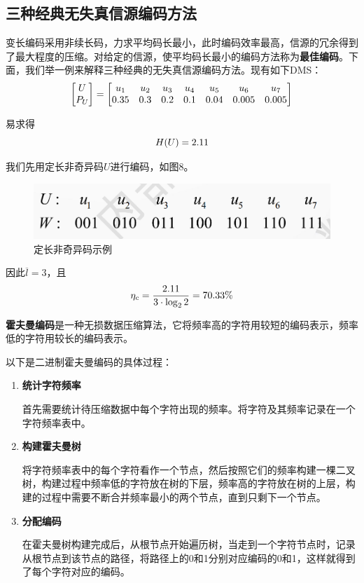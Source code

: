 \documentclass[UTF8,a4paper,11pt]{article}
\begin{document}
\subsection{三种经典无失真信源编码方法}
变长编码采用非续长码，力求平均码长最小，此时编码效率最高，信源的冗余得到了最大程度的压缩。对给定的信源，使平均码长最小的编码方法称为\textbf{最佳编码}。下面，我们举一例来解释三种经典的无失真信源编码方法。现有如下DMS：
\begin{equation}
\notag
\begin{bmatrix}
U\\ 
P_U\\ 
\end{bmatrix}
=
\begin{bmatrix}
u_1&u_2&u_3&u_4&u_5&u_6&u_7\\ 
0.35&0.3&0.2&0.1&0.04&0.005&0.005\\ 
\end{bmatrix}
\end{equation}

易求得
\begin{equation}
\notag
H(U)=2.11
\end{equation}

我们先用定长非奇异码$U$进行编码，如图8。
\begin{figure}[htbp]
\centering
\includegraphics[scale=0.45]{p8.png}
\caption{定长非奇异码示例}
\end{figure}

因此$\overline{l}=3$，且
\begin{equation}
\notag
\eta_c=\frac{2.11}{3\cdot\log_{2}{2}}=70.33\%
\end{equation}

\textbf{霍夫曼编码}是一种无损数据压缩算法，它将频率高的字符用较短的编码表示，频率低的字符用较长的编码表示。

以下是二进制霍夫曼编码的具体过程：
\begin{enumerate}
\item \textbf{统计字符频率}

首先需要统计待压缩数据中每个字符出现的频率。将字符及其频率记录在一个字符频率表中。

\item \textbf{构建霍夫曼树}

将字符频率表中的每个字符看作一个节点，然后按照它们的频率构建一棵二叉树，构建过程中频率低的字符放在树的下层，频率高的字符放在树的上层，构建的过程中需要不断合并频率最小的两个节点，直到只剩下一个节点。

\item \textbf{分配编码}

在霍夫曼树构建完成后，从根节点开始遍历树，当走到一个字符节点时，记录从根节点到该节点的路径，将路径上的0和1分别对应编码的0和1，这样就得到了每个字符对应的编码。
\end{enumerate}
\end{document}
